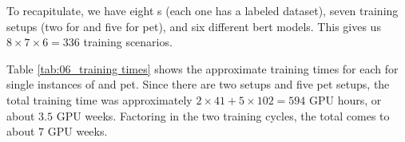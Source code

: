 \label{06_methodology_summary}


To recapitulate, we have eight \contentType{}s (each one has a labeled dataset), seven training setups (two for \finetuning{} and five for \gls{pet}), and six different \gls{bert} models. This gives us $8\times 7 \times 6 = 336$ training scenarios.



Table \ref{tab:06_training times} shows the approximate training times for each \contentType{} for single instances of \finetuning{} and \gls{pet}. Since there are two \finetuning{} setups and five \gls{pet} setups, the total training time was approximately $2\times 41 + 5 \times 102 = 594 $ GPU hours, or about $3.5$ GPU weeks.
Factoring in the two training cycles, the total comes to about $7$ GPU weeks.
